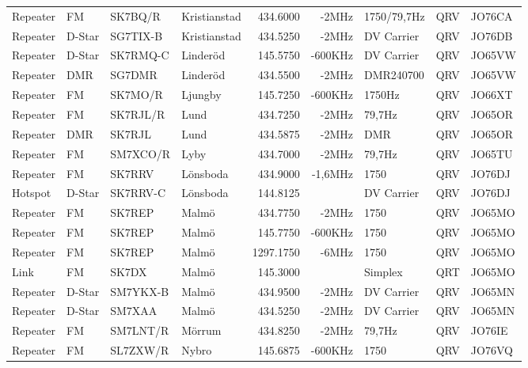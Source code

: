 \begin{landscape}
\begin{longtable}{llllrrlcl}
Repeater & FM     & SK7BQ/R  & Kristianstad        & 434.6000  & -2MHz   & 1750/79,7Hz  & QRV  & JO76CA \\
Repeater & D-Star & SG7TIX-B & Kristianstad        & 434.5250  & -2MHz   & DV Carrier   & QRV  & JO76DB \\
Repeater & D-Star & SK7RMQ-C & Linderöd            & 145.5750  & -600KHz & DV Carrier   & QRV  & JO65VW \\
Repeater & DMR    & SG7DMR   & Linderöd            & 434.5500  & -2MHz   & DMR240700    & QRV  & JO65VW \\
Repeater & FM     & SK7MO/R  & Ljungby             & 145.7250  & -600KHz & 1750Hz       & QRV  & JO66XT \\
Repeater & FM     & SK7RJL/R & Lund                & 434.7250  & -2MHz   & 79,7Hz       & QRV  & JO65OR \\
Repeater & DMR    & SK7RJL   & Lund                & 434.5875  & -2MHz   & DMR          & QRV  & JO65OR \\
Repeater & FM     & SM7XCO/R & Lyby                & 434.7000  & -2MHz   & 79,7Hz       & QRV  & JO65TU \\
Repeater & FM     & SK7RRV   & Lönsboda            & 434.9000  & -1,6MHz & 1750         & QRV  & JO76DJ \\
Hotspot  & D-Star & SK7RRV-C & Lönsboda            & 144.8125  &         & DV Carrier   & QRV  & JO76DJ \\
Repeater & FM     & SK7REP   & Malmö               & 434.7750  & -2MHz   & 1750         & QRV  & JO65MO \\
Repeater & FM     & SK7REP   & Malmö               & 145.7750  & -600KHz & 1750         & QRV  & JO65MO \\
Repeater & FM     & SK7REP   & Malmö               & 1297.1750 & -6MHz   & 1750         & QRV  & JO65MO \\
Link     & FM     & SK7DX    & Malmö               & 145.3000  &         & Simplex      & QRT  & JO65MO \\
Repeater & D-Star & SM7YKX-B & Malmö               & 434.9500  & -2MHz   & DV Carrier   & QRV  & JO65MN \\
Repeater & D-Star & SM7XAA   & Malmö               & 434.5250  & -2MHz   & DV Carrier   & QRV  & JO65MN \\
Repeater & FM     & SM7LNT/R & Mörrum              & 434.8250  & -2MHz   & 79,7Hz       & QRV  & JO76IE \\
Repeater & FM     & SL7ZXW/R & Nybro               & 145.6875  & -600KHz & 1750         & QRV  & JO76VQ \\

\end{longtable}
\end{landscape}
